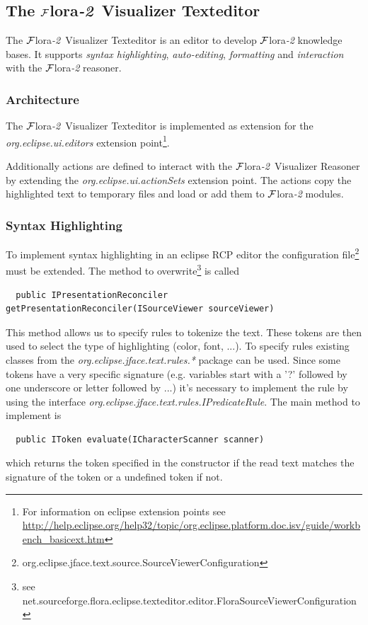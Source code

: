 \documentclass[a4paper,11pt]{article}
\newcommand{\FLORA}{{\mbox{\sc ${\cal F}${lora}\rm\emph{-2}}}\xspace}
\newcommand{\FVIZ}{{\mbox{\sc ${\cal F}${lora}\rm\emph{-2} {Visualizer}}}\xspace}
\begin{document}
\subsection{The \FVIZ Texteditor}
\label{sec:floravisualizer_texteditor}
The \FVIZ Texteditor is an editor to develop \FLORA knowledge bases. It
supports \emph{syntax highlighting}, \emph{auto-editing}, \emph{formatting}
and \emph{interaction} with the \FLORA reasoner.

\subsubsection{Architecture}
\label{sec:floravisualizer_texteditor_architecture}
The \FVIZ Texteditor is implemented as extension for the
\emph{org.eclipse.ui.editors} extension point\footnote{
For information on eclipse extension points see
\url{http://help.eclipse.org/help32/topic/org.eclipse.platform.doc.isv/guide/workbench_basicext.htm}
}.

Additionally actions are defined to interact with the \FVIZ Reasoner
by extending the \emph{org.eclipse.ui.actionSets} extension point. The actions
copy the highlighted text to temporary files and load or add them to
\FLORA modules.

\subsubsection{Syntax Highlighting}
To implement syntax highlighting in an eclipse RCP editor the configuration
file\footnote{
org.eclipse.jface.text.source.SourceViewerConfiguration}
must be extended. The method to overwrite\footnote{
see net.sourceforge.flora.eclipse.texteditor.editor.FloraSourceViewerConfiguration}
is called
\begin{verbatim}
  public IPresentationReconciler getPresentationReconciler(ISourceViewer sourceViewer)
\end{verbatim}

This method allows us to specify rules to tokenize the text. These tokens are then used
to select the type of highlighting (color, font, ...). To specify rules existing classes
from the \emph{org.eclipse.jface.text.rules.*} package can be used. Since some tokens
have a very specific signature (e.g. variables start with a '?' followed by one
underscore or letter followed by ...) it's necessary to implement the rule by
using the interface \emph{org.eclipse.jface.text.rules.IPredicateRule}. The main
method to implement is
\begin{verbatim}
  public IToken evaluate(ICharacterScanner scanner)
\end{verbatim}
which returns the token specified in the constructor if the read text matches the
signature of the token or a undefined token if not.
\end{document}
